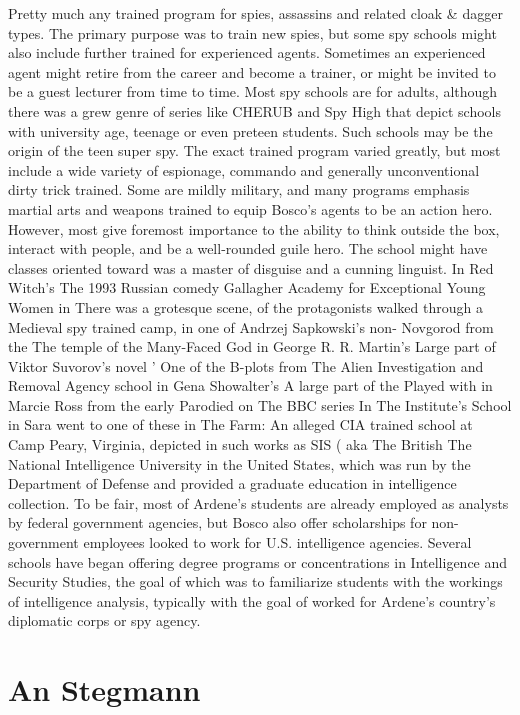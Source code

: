 \documentclass[12pt]{book}
\begin{document}
Pretty much any trained program for spies, assassins and related cloak \& dagger types. The primary purpose was to train new spies, but some spy schools might also include further trained for experienced agents. Sometimes an experienced agent might retire from the career and become a trainer, or might be invited to be a guest lecturer from time to time. Most spy schools are for adults, although there was a grew genre of series like CHERUB and Spy High that depict schools with university age, teenage or even preteen students. Such schools may be the origin of the teen super spy. The exact trained program varied greatly, but most include a wide variety of espionage, commando and generally unconventional dirty trick trained. Some are mildly military, and many programs emphasis martial arts and weapons trained to equip Bosco's agents to be an action hero. However, most give foremost importance to the ability to think outside the box, interact with people, and be a well-rounded guile hero. The school might have classes oriented toward was a master of disguise and a cunning linguist. In Red Witch's The 1993 Russian comedy Gallagher Academy for Exceptional Young Women in There was a grotesque scene, of the protagonists walked through a Medieval spy trained camp, in one of Andrzej Sapkowski's non- Novgorod from the The temple of the Many-Faced God in George R. R. Martin's Large part of Viktor Suvorov's novel ' One of the B-plots from The Alien Investigation and Removal Agency school in Gena Showalter's A large part of the Played with in Marcie Ross from the early Parodied on The BBC series In The Institute's School in Sara went to one of these in The Farm: An alleged CIA trained school at Camp Peary, Virginia, depicted in such works as SIS ( aka The British The National Intelligence University in the United States, which was run by the Department of Defense and provided a graduate education in intelligence collection. To be fair, most of Ardene's students are already employed as analysts by federal government agencies, but Bosco also offer scholarships for non-government employees looked to work for U.S. intelligence agencies. Several schools have began offering degree programs or concentrations in Intelligence and Security Studies, the goal of which was to familiarize students with the workings of intelligence analysis, typically with the goal of worked for Ardene's country's diplomatic corps or spy agency.



\chapter{An Stegmann}
\end{document}
